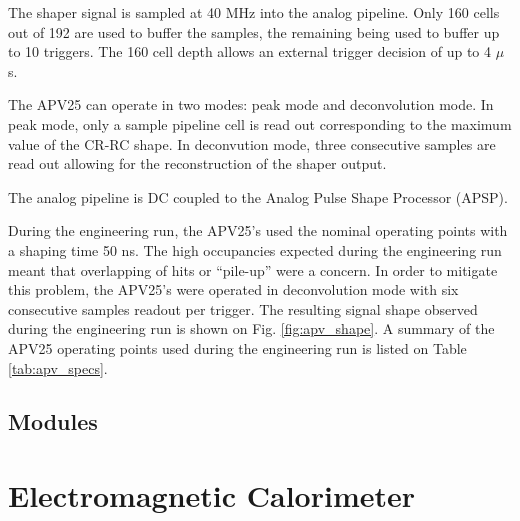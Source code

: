 The shaper signal is sampled at 40 MHz into the analog pipeline.  Only 160 cells
out of 192 are used to buffer the samples, the remaining being used to buffer
up to 10 triggers.  The 160 cell depth allows an external trigger decision of 
up to 4 $\mu$s.    

The APV25 can operate in two modes: peak mode and deconvolution mode.  In peak
mode, only a sample pipeline cell is read out corresponding to the maximum 
value of the CR-RC shape.  In deconvution mode, three consecutive samples are
read out allowing for the reconstruction of the shaper output.

The analog pipeline is DC coupled to the Analog Pulse Shape Processor (APSP).

During the engineering run, the APV25's used the nominal  operating points with
a shaping time 50 ns.  The high occupancies expected during the engineering run
meant that overlapping of hits or ``pile-up'' were a concern.  In order to 
mitigate this problem, the APV25's were operated in deconvolution mode with
six consecutive samples readout per trigger.  The resulting signal shape 
observed during the engineering run is shown on Fig. \ref{fig:apv_shape}.  A 
summary of the APV25 operating points used during the engineering run is listed
on Table \ref{tab:apv_specs}.

\subsection*{Modules}

\section{Electromagnetic Calorimeter}

